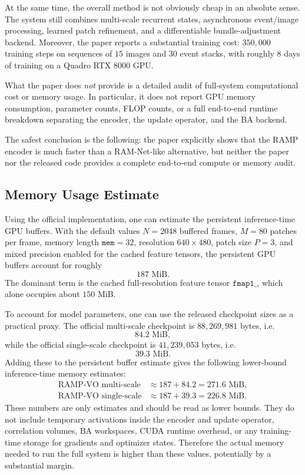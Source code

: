 \documentclass[11pt]{article}
\begin{document}
At the same time, the overall method is not obviously cheap in an absolute sense. The system still combines multi-scale recurrent states, asynchronous event/image processing, learned patch refinement, and a differentiable bundle-adjustment backend. Moreover, the paper reports a substantial training cost: \(350{,}000\) training steps on sequences of \(15\) images and \(30\) event stacks, with roughly \(8\) days of training on a Quadro RTX 8000 GPU.

What the paper does \emph{not} provide is a detailed audit of full-system computational cost or memory usage. In particular, it does not report GPU memory consumption, parameter counts, FLOP counts, or a full end-to-end runtime breakdown separating the encoder, the update operator, and the BA backend.

The safest conclusion is the following: the paper explicitly shows that the RAMP encoder is much faster than a RAM-Net-like alternative, but neither the paper nor the released code provides a complete end-to-end compute or memory audit.

\subsection{Memory Usage Estimate}

Using the official implementation, one can estimate the persistent inference-time GPU buffers. With the default values \(N=2048\) buffered frames, \(M=80\) patches per frame, memory length \(\texttt{mem}=32\), resolution \(640\times 480\), patch size \(P=3\), and mixed precision enabled for the cached feature tensors, the persistent GPU buffers account for roughly
\begin{equation}
187 \text{ MiB}.
\end{equation}
The dominant term is the cached full-resolution feature tensor \(\texttt{fmap1\_}\), which alone occupies about \(150\) MiB.

To account for model parameters, one can use the released checkpoint sizes as a practical proxy. The official multi-scale checkpoint is \(88{,}269{,}981\) bytes, i.e.
\begin{equation}
84.2 \text{ MiB},
\end{equation}
while the official single-scale checkpoint is \(41{,}239{,}053\) bytes, i.e.
\begin{equation}
39.3 \text{ MiB}.
\end{equation}
Adding these to the persistent buffer estimate gives the following lower-bound inference-time memory estimates:
\begin{align}
\text{RAMP-VO multi-scale} &\approx 187 + 84.2 = 271.6 \text{ MiB}, \\
\text{RAMP-VO single-scale} &\approx 187 + 39.3 = 226.8 \text{ MiB}.
\end{align}
These numbers are only estimates and should be read as lower bounds. They do not include temporary activations inside the encoder and update operator, correlation volumes, BA workspaces, CUDA runtime overhead, or any training-time storage for gradients and optimizer states. Therefore the actual memory needed to run the full system is higher than these values, potentially by a substantial margin.
\end{document}
